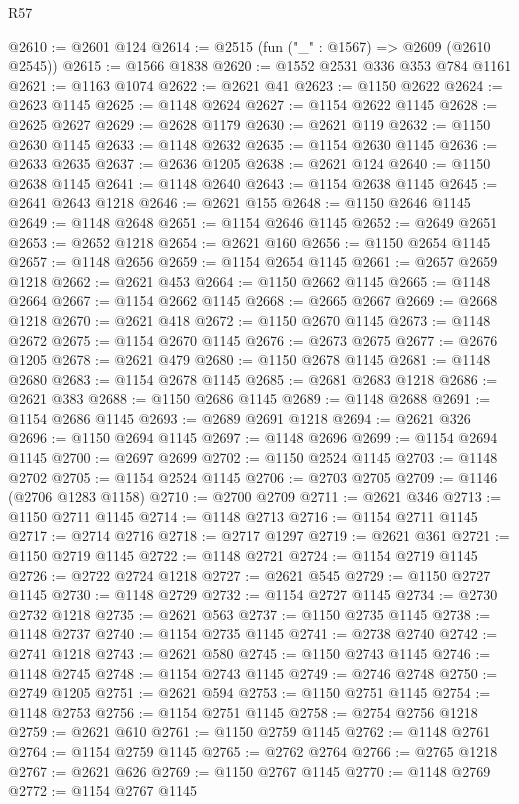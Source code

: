 \begin{lexlean}{R57}
\begin{coremodule}
@2610 := @2601 @124
@2614 := @2515 (fun ("_" : @1567) => @2609 (@2610 @2545))
@2615 := @1566 @1838
@2620 := @1552 @2531 @336 @353 @784 @1161
@2621 := @1163 @1074
@2622 := @2621 @41
@2623 := @1150 @2622
@2624 := @2623 @1145
@2625 := @1148 @2624
@2627 := @1154 @2622 @1145
@2628 := @2625 @2627
@2629 := @2628 @1179
@2630 := @2621 @119
@2632 := @1150 @2630 @1145
@2633 := @1148 @2632
@2635 := @1154 @2630 @1145
@2636 := @2633 @2635
@2637 := @2636 @1205
@2638 := @2621 @124
@2640 := @1150 @2638 @1145
@2641 := @1148 @2640
@2643 := @1154 @2638 @1145
@2645 := @2641 @2643 @1218
@2646 := @2621 @155
@2648 := @1150 @2646 @1145
@2649 := @1148 @2648
@2651 := @1154 @2646 @1145
@2652 := @2649 @2651
@2653 := @2652 @1218
@2654 := @2621 @160
@2656 := @1150 @2654 @1145
@2657 := @1148 @2656
@2659 := @1154 @2654 @1145
@2661 := @2657 @2659 @1218
@2662 := @2621 @453
@2664 := @1150 @2662 @1145
@2665 := @1148 @2664
@2667 := @1154 @2662 @1145
@2668 := @2665 @2667
@2669 := @2668 @1218
@2670 := @2621 @418
@2672 := @1150 @2670 @1145
@2673 := @1148 @2672
@2675 := @1154 @2670 @1145
@2676 := @2673 @2675
@2677 := @2676 @1205
@2678 := @2621 @479
@2680 := @1150 @2678 @1145
@2681 := @1148 @2680
@2683 := @1154 @2678 @1145
@2685 := @2681 @2683 @1218
@2686 := @2621 @383
@2688 := @1150 @2686 @1145
@2689 := @1148 @2688
@2691 := @1154 @2686 @1145
@2693 := @2689 @2691 @1218
@2694 := @2621 @326
@2696 := @1150 @2694 @1145
@2697 := @1148 @2696
@2699 := @1154 @2694 @1145
@2700 := @2697 @2699
@2702 := @1150 @2524 @1145
@2703 := @1148 @2702
@2705 := @1154 @2524 @1145
@2706 := @2703 @2705
@2709 := @1146 (@2706 @1283 @1158)
@2710 := @2700 @2709
@2711 := @2621 @346
@2713 := @1150 @2711 @1145
@2714 := @1148 @2713
@2716 := @1154 @2711 @1145
@2717 := @2714 @2716
@2718 := @2717 @1297
@2719 := @2621 @361
@2721 := @1150 @2719 @1145
@2722 := @1148 @2721
@2724 := @1154 @2719 @1145
@2726 := @2722 @2724 @1218
@2727 := @2621 @545
@2729 := @1150 @2727 @1145
@2730 := @1148 @2729
@2732 := @1154 @2727 @1145
@2734 := @2730 @2732 @1218
@2735 := @2621 @563
@2737 := @1150 @2735 @1145
@2738 := @1148 @2737
@2740 := @1154 @2735 @1145
@2741 := @2738 @2740
@2742 := @2741 @1218
@2743 := @2621 @580
@2745 := @1150 @2743 @1145
@2746 := @1148 @2745
@2748 := @1154 @2743 @1145
@2749 := @2746 @2748
@2750 := @2749 @1205
@2751 := @2621 @594
@2753 := @1150 @2751 @1145
@2754 := @1148 @2753
@2756 := @1154 @2751 @1145
@2758 := @2754 @2756 @1218
@2759 := @2621 @610
@2761 := @1150 @2759 @1145
@2762 := @1148 @2761
@2764 := @1154 @2759 @1145
@2765 := @2762 @2764
@2766 := @2765 @1218
@2767 := @2621 @626
@2769 := @1150 @2767 @1145
@2770 := @1148 @2769
@2772 := @1154 @2767 @1145

\end{coremodule}
\end{lexlean}
